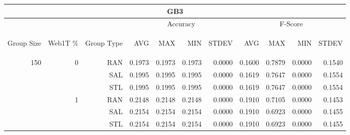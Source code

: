 \begin{center}
\begin{table}[htbp]
\begin{tabular}{ | r | r | r | r | r | r | r | r | r | r | r |}
\hline
\multicolumn{11}{|c|}{GB3}\\
\hline
 & & & \multicolumn{4}{|c|}{Accuracy} & \multicolumn{4}{|c|}{F-Score}\\ \cline{4-11}
\begin{sideways}Group Size\end{sideways} & \begin{sideways}Web1T \%\end{sideways} & \begin{sideways}Group Type\end{sideways} & \begin{sideways}AVG\end{sideways} & \begin{sideways}MAX\end{sideways} & \begin{sideways}MIN\end{sideways} & \begin{sideways}STDEV\end{sideways} & \begin{sideways}AVG\end{sideways} & \begin{sideways}MAX\end{sideways} & \begin{sideways}MIN\end{sideways} & \begin{sideways}STDEV\end{sideways}\\
\hline
\multirow{18}{*}{150}
 & \multirow{3}{*}{0} & RAN & 0.1973 & 0.1973 & 0.1973 & 0.0000 & 0.1600 & 0.7879 & 0.0000 & 0.1540\\ \cline{3-11}
 &   & SAL & 0.1995 & 0.1995 & 0.1995 & 0.0000 & 0.1619 & 0.7647 & 0.0000 & 0.1554\\ \cline{3-11}
 &   & STL & 0.1995 & 0.1995 & 0.1995 & 0.0000 & 0.1619 & 0.7647 & 0.0000 & 0.1554\\ \cline{2-11}
 & \multirow{3}{*}{1} & RAN & 0.2148 & 0.2148 & 0.2148 & 0.0000 & 0.1910 & 0.7105 & 0.0000 & 0.1453\\ \cline{3-11}
 &   & SAL & 0.2154 & 0.2154 & 0.2154 & 0.0000 & 0.1910 & 0.6923 & 0.0000 & 0.1455\\ \cline{3-11}
 &   & STL & 0.2154 & 0.2154 & 0.2154 & 0.0000 & 0.1910 & 0.6923 & 0.0000 & 0.1455\\ \cline{2-11}

\end{tabular}
\end{table}
\end{center}
